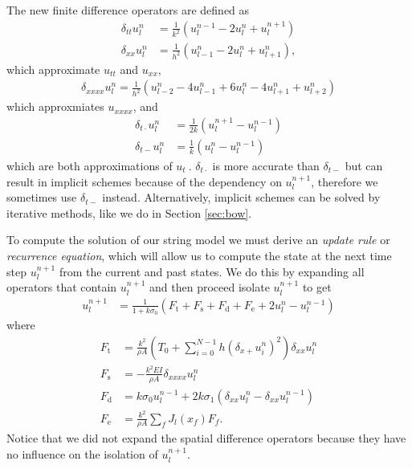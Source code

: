 \documentclass{article}
\begin{document}
The new finite difference operators are defined as
\begin{align}
  \delta_{tt}u^n_l &= \frac{1}{k^2}(u^{n-1}_l - 2 u^n_l + u^{n+1}_l) \\
  \delta_{xx}u^n_l &= \frac{1}{h^2}(u^n_{l-1} - 2 u^n_l + u^n_{l+1}),
\end{align}
which approximate $u_{tt}$ and $u_{xx}$,
\begin{align}
  \delta_{xxxx}u^n_l = \frac{1}{h^2}(u^n_{l-2} - 4 u^n_{l-1} + 6 u^n_l - 4 u^n_{l+1} + u^n_{l+2})
\end{align}
which approxmiates $u_{xxxx}$, and
\begin{align}
  \delta_{t\cdot}u^n_l &= \frac{1}{2k} (u^{n+1}_l - u^{n-1}_l) \\
  \delta_{t-}u^n_l &=\frac{1}{k} (u^{n}_l - u^{n-1}_l)
\end{align}
which are both approximations of $u_t\ $. $\delta_{t\cdot}$ is more accurate than $\delta_{t-}$ but can result in implicit schemes because of the dependency on $u_l^{n+1}$, therefore we sometimes use $\delta_{t-}$ instead. Alternatively, implicit schemes can be solved by iterative methods, like we do in Section \ref{sec:bow}.

To compute the solution of our string model we must derive an \textit{update rule} or \textit{recurrence equation}, which will allow us to compute the state at the next time step $u^{n+1}_l$ from the current and past states.
We do this by expanding all operators that contain $u^{n+1}_l$ and then proceed isolate $u^{n+1}_l$ to get
\begin{align}
  \label{eq:stringUpdate}
  u^{n+1}_l &= \frac{1}{1 + k\sigma_0} (F_\text{t} + F_\text{s} + F_\text{d} + F_\text{e} + 2u^n_l - u^{n-1}_l)
\end{align}
where
\begin{align}
  F_\text{t} &= \frac{k^2}{\rho A} \left(T_0 + \sum^{N-1}_{i=0} h(\delta_{x+} u^n_i)^2 \right)\delta_{xx}u_l^n \\
  F_\text{s} &= -\frac{k^2 E I}{\rho A} \delta_{xxxx} u^n_l\\
  F_\text{d} &= k\sigma_0u^{n-1}_l + 2k\sigma_1 (\delta_{xx}u^n_l - \delta_{xx}u^{n-1}_l)\\
  F_\text{e} &= \frac{k^2}{\rho A}\sum_fJ_l(x_f)F_f.
\end{align}
Notice that we did not expand the spatial difference operators because they have no influence on the isolation of $u^{n+1}_l$.
\end{document}
